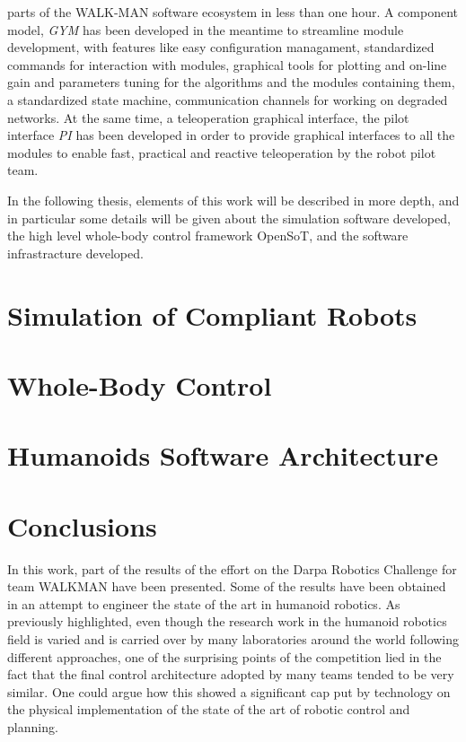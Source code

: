 \documentclass[%
	paper=A4,					%
	twoside=true,				%
	openright,			.
	parskip=full,				%
	chapterprefix=true,			%
	11pt,						%
	headings=normal,			%
	bibliography=totoc,			%
	listof=totoc,				%
	titlepage=on,				%
	captions=tableabove,		%
	draft=true,				%
]{scrreprt}%
\begin{document}
parts of the WALK-MAN software ecosystem in less than one hour. A component model, \emph{GYM} has been developed in the meantime to streamline module development, with features like easy configuration managament, standardized commands for interaction with modules, graphical tools for plotting and on-line gain and parameters tuning for the algorithms and the modules containing them, a standardized state machine, communication channels for working on degraded networks. At the same time, a teleoperation graphical interface, the pilot interface \emph{PI} has been developed in order to provide graphical interfaces to all the modules to enable fast, practical and reactive teleoperation by the robot pilot team.

In the following thesis, elements of this work will be described in more depth, and in particular some details will be given about the simulation software developed, the high level whole-body control framework OpenSoT, and the software infrastracture developed.
 
\chapter{Simulation of Compliant Robots}


\chapter{Whole-Body Control}


\chapter{Humanoids Software Architecture}
\label{architecture}


\chapter{Conclusions}

In this work, part of the results of the effort on the Darpa Robotics Challenge for team WALKMAN have been presented.
Some of the results have been obtained in an attempt to engineer the state of the art in humanoid robotics.
As previously highlighted, even though the research work in the humanoid robotics field is varied and is carried over by many laboratories around the world following different approaches, one of the surprising points of the competition lied in the fact that the final control architecture adopted by many teams tended to be very similar. One could argue how this showed a significant cap put by technology on the physical implementation of the state of the art of robotic control and planning.
\end{document}
